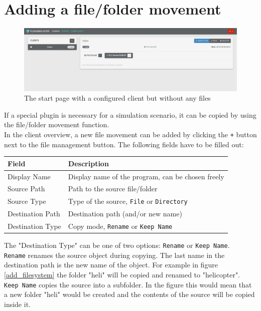 \documentclass[accentcolor=tud1a, paper=a4, colorback]{tudreport}
\begin{document}
	\section{Adding a file/folder movement}

	\begin{figure}[h]
		\centering
		\includegraphics[width=.9\textwidth]{startpage_without_files}
		\caption{The start page with a configured client but without any files}
		\label{startpage_without_files}
	\end{figure}
	If a special plugin is necessary for a simulation scenario, it can be copied by using
	the file/folder movement function.
	\\
	In the client overview, a new file movement can be added by clicking the \texttt{+} button
	next to the file management button. The following fields have to be filled out:
	\\
	\begin{center}
	\begin{tabular}{l|l}
		Field & Description \\\hline
		Display Name &  Display name of the program, can be chosen freely\\
		Source Path & Path to the source file/folder\\
		Source Type & Type of the source, \texttt{File} or \texttt{Directory}\\
		Destination Path & Destination path (and/or new name)\\
		Destination Type & Copy mode, \texttt{Rename} or \texttt{Keep Name}\\
	\end{tabular}
	\end{center}
	The "Destination Type" can be one of two options: \texttt{Rename} or \texttt{Keep Name}.\\
	\texttt{Rename} renames the source object during copying. The last name in the destination path
	is the new name of the object. For example in figure \ref{add_filesystem} the folder
	"heli" will be copied and renamed to "helicopter".\\
	\texttt{Keep Name} copies the source into a subfolder. In the figure this would mean that
	a new folder "heli" would be created and the contents of the source will
	be copied inside it.
\end{document}
